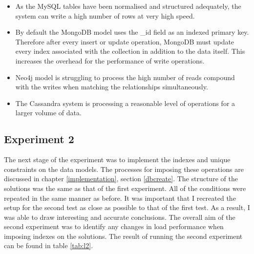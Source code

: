 \begin{itemize}
\item As the MySQL tables have been normalised and structured adequately, the system can write a high number of rows at very high speed.
\item By default the MongoDB model uses the \_id field as an indexed primary key. Therefore after every insert or update operation, MongoDB must update every index associated with the collection in addition to the data itself. This increases the overhead for the performance of write operations.
\item Neo4j model is struggling to process the high number of reads compound with the writes when matching the relationships simultaneously.
\item The Cassandra system is processing a reasonable level of operations for a larger volume of data.
\end{itemize}

\subsection{Experiment 2}\label{experiment2}
The next stage of the experiment was to implement the indexes and unique constraints on the data models. The processes for imposing these operations are discussed in chapter \ref{implementation}, section \ref{dbcreate}. The structure of the solutions was the same as that of the first experiment. All of the conditions were repeated in the same manner as before. It was important that I recreated the setup for the second test as close as possible to that of the first test. As a result, I was able to draw interesting and accurate conclusions. The overall aim of the second experiment was to identify any changes in load performance when imposing indexes on the solutions. The result of running the second experiment can be found in table \ref{tab:l2}.

